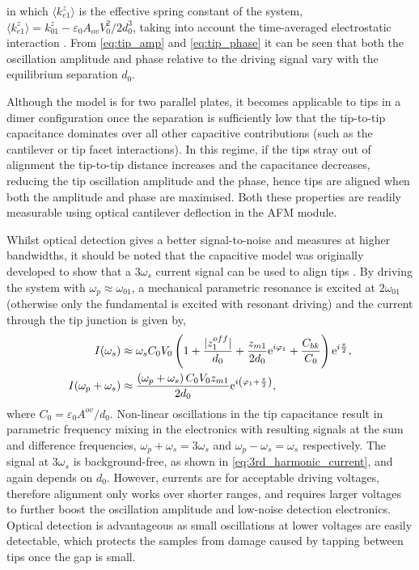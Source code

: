 \documentclass{article}
\begin{document}
in which $\langle k_{e1}^z \rangle$ is the effective spring constant of the system, $\langle k_{e1}^{z} \rangle = k_{01}^z - {\varepsilon_0 A_{ov} V_0^2}/{2d_0^3}$, taking into account the time-averaged electrostatic interaction \cite{savage2011}. From \eqref{eq:tip_amp} and \eqref{eq:tip_phase} it can be seen that both the oscillation amplitude and phase relative to the driving signal vary with the equilibrium separation $d_0$.

Although the model is for two parallel plates, it becomes applicable to tips in a dimer configuration once the separation is sufficiently low that the tip-to-tip capacitance dominates over all other capacitive contributions (such as the cantilever or tip facet interactions). In this regime, if the tips stray out of alignment the tip-to-tip distance increases and the capacitance decreases, reducing the tip oscillation amplitude and the phase, hence tips are aligned when both the amplitude and phase are maximised. Both these properties are readily measurable using optical cantilever deflection in the AFM module.

Whilst optical detection gives a better signal-to-noise and measures at higher bandwidths, it should be noted that the capacitive model was originally developed to show that a $3\omega_s$ current signal can be used to align tips \cite{savage2011}. By driving the system with $\omega_p \approx \omega_{01}$, a mechanical parametric resonance is excited at $2\omega_{01}$ (otherwise only the fundamental is excited with resonant driving) and the current through the tip junction is given by,
\begin{subequations}
\begin{align}
I(\omega_{s}) & \approx \omega_{s}C_{0}V_{0} \left(1+\frac{|z_1^{off}|}{d_{0}}+\frac{z_{m1}}{2d_{0}}\e^{i\varphi_1}+\frac{C_{bk}}{C_{0}}\right)\e^{i\frac{\pi}{2}},\\
%
I(\omega_{p}+\omega_{s}) & \approx \frac{\left(\omega_{p}+\omega_{s}\right)C_{0}V_{0}z_{m1}}{2d_{0}} \e^{i\left(\varphi_1 + \frac{\pi}{2}\right)},
\label{eq:3rd_harmonic_current}
\end{align}
\end{subequations}
where $C_0 = \varepsilon_0 A^{ov} / d_0$. Non-linear oscillations in the tip capacitance result in parametric frequency mixing in the electronics with resulting signals at the sum and difference frequencies, $\omega_{p}+\omega_{s}=3\omega_{s}$ and $\omega_{p}-\omega_{s}=\omega_{s}$ respectively. The signal at $3\omega_{s}$ is background-free, as shown in \eqref{eq:3rd_harmonic_current}, and again depends on $d_{0}$. However, currents are  for acceptable driving voltages, therefore alignment only works over shorter ranges, and requires larger voltages to further boost the oscillation amplitude and low-noise detection electronics. Optical detection is advantageous as small oscillations at lower voltages are easily detectable, which protects the samples from damage caused by tapping between tips once the gap is small.
\end{document}
